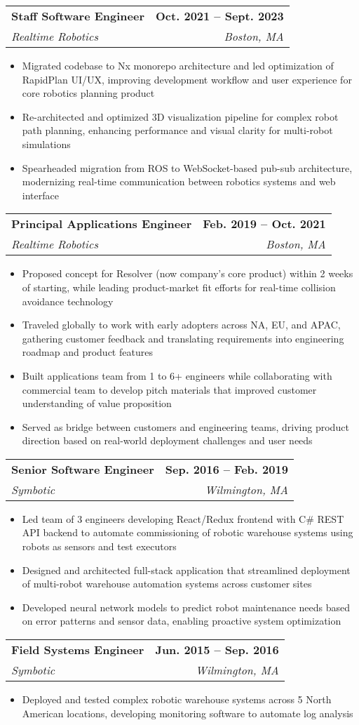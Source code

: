 \documentclass[letterpaper,11pt]{article}
\makeatletter
\newcommand{\resumeItem}[1]{
  \item\small{
    {#1 \vspace{-2pt}}
  }
}
\newcommand{\resumeSubheading}[4]{
  \vspace{-2pt}\item
    \begin{tabular*}{1.0\textwidth}[t]{l@{\extracolsep{\fill}}r}
      \textbf{#1} & \textbf{\small #2} \\
      \textit{\small#3} & \textit{\small #4} \\
    \end{tabular*}\vspace{-7pt}
}
\newcommand{\resumeItemListStart}{\begin{itemize}}
\newcommand{\resumeItemListEnd}{\end{itemize}\vspace{-5pt}}
\makeatother
\begin{document}
    \resumeSubheading
      {Staff Software Engineer}{Oct. 2021 -- Sept. 2023}
      {Realtime Robotics}{Boston, MA}
      \resumeItemListStart
        \resumeItem{Migrated codebase to Nx monorepo architecture and led optimization of RapidPlan UI/UX, improving development workflow and user experience for core robotics planning product}
        \resumeItem{Re-architected and optimized 3D visualization pipeline for complex robot path planning, enhancing performance and visual clarity for multi-robot simulations}
        \resumeItem{Spearheaded migration from ROS to WebSocket-based pub-sub architecture, modernizing real-time communication between robotics systems and web interface}
    \resumeItemListEnd

    \resumeSubheading
      {Principal Applications Engineer}{Feb. 2019 -- Oct. 2021}
      {Realtime Robotics}{Boston, MA}
      \resumeItemListStart
        \resumeItem{Proposed concept for Resolver (now company's core product) within 2 weeks of starting, while leading product-market fit efforts for real-time collision avoidance technology}
        \resumeItem{Traveled globally to work with early adopters across NA, EU, and APAC, gathering customer feedback and translating requirements into engineering roadmap and product features}
        \resumeItem{Built applications team from 1 to 6+ engineers while collaborating with commercial team to develop pitch materials that improved customer understanding of value proposition}
        \resumeItem{Served as bridge between customers and engineering teams, driving product direction based on real-world deployment challenges and user needs}
    \resumeItemListEnd

    \resumeSubheading
      {Senior Software Engineer}{Sep. 2016 -- Feb. 2019}
      {Symbotic}{Wilmington, MA}
      \resumeItemListStart
        \resumeItem{Led team of 3 engineers developing React/Redux frontend with C\# REST API backend to automate commissioning of robotic warehouse systems using robots as sensors and test executors}
        \resumeItem{Designed and architected full-stack application that streamlined deployment of multi-robot warehouse automation systems across customer sites}
        \resumeItem{Developed neural network models to predict robot maintenance needs based on error patterns and sensor data, enabling proactive system optimization}
      \resumeItemListEnd

    \resumeSubheading
      {Field Systems Engineer}{Jun. 2015 -- Sep. 2016}
      {Symbotic}{Wilmington, MA}
      \resumeItemListStart
        \resumeItem{Deployed and tested complex robotic warehouse systems across 5 North American locations, developing monitoring software to automate log analysis}
      \resumeItemListEnd
\end{document}
